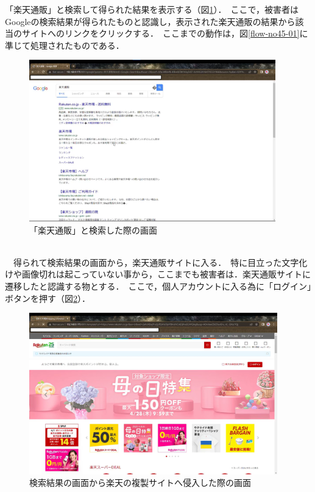 \documentclass[dvipdfmx]{jsarticle}
\begin{document}
                    \clearpage
                    「楽天通販」と検索して得られた結果を表示する（図\ref{rakuten-02}）．\
                    ここで，被害者はGoogleの検索結果が得られたものと認識し，表示された楽天通販の結果から該当のサイトへのリンクをクリックする．\
                    ここまでの動作は，図\ref{flow-no45-01}に準じて処理されたものである．\
                    \begin{figure}[pth]
                        \centering
                        \includegraphics[height=7cm]{img/rakuten/rakuten-02.png}
                        \caption{「楽天通販」と検索した際の画面}
                        \label{rakuten-02}
                    \end{figure}
                    \\
                    　得られて検索結果の画面から，楽天通販サイトに入る．\
                    特に目立った文字化けや画像切れは起こっていない事から，ここまでも被害者は．楽天通販サイトに遷移したと認識する物とする．\
                    ここで，個人アカウントに入る為に「ログイン」ボタンを押す（図\ref{rakuten-03}）．\
                    \begin{figure}[pth]
                        \centering
                        \includegraphics[height=7cm]{img/rakuten/rakuten-03.png}
                        \caption{検索結果の画面から楽天の複製サイトへ侵入した際の画面}
                        \label{rakuten-03}
                    \end{figure}
\end{document}
